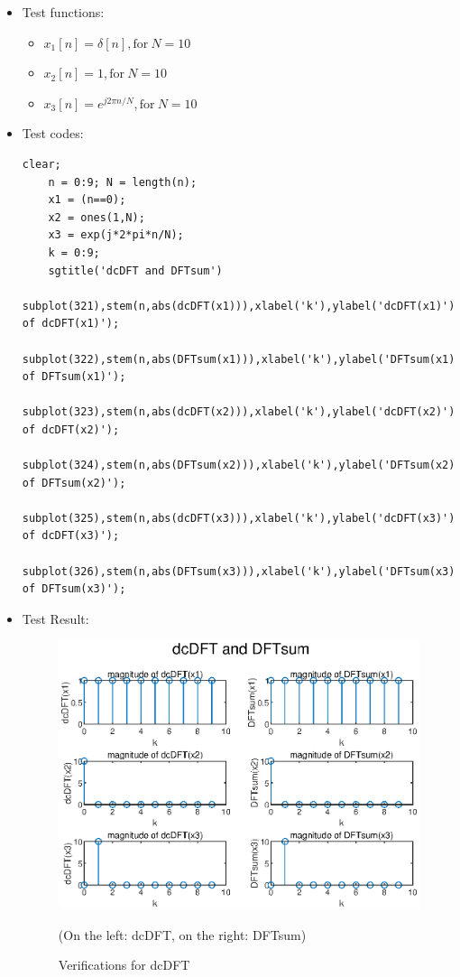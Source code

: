 \documentclass[onecolumn,oneside]{SUSTechHomework}
\begin{document}
\begin{itemize}
	\begin{itemize}
		\item Test functions:
		\begin{itemize}
			\item $x_1[n]=\delta[n], \text{for}\ N=10$
			\item $x_2[n]=1, \text{for}\ N=10$
			\item $x_3[n]=e^{j2\pi n/N}, \text{for}\ N=10$
		\end{itemize}
		\item Test codes:
\begin{lstlisting}[title=\textbf{q5\_3\_1}]
	clear;
	n = 0:9; N = length(n);
	x1 = (n==0);
	x2 = ones(1,N);
	x3 = exp(j*2*pi*n/N);
	k = 0:9;
	sgtitle('dcDFT and DFTsum')
	subplot(321),stem(n,abs(dcDFT(x1))),xlabel('k'),ylabel('dcDFT(x1)'),title('magnitude of dcDFT(x1)');
	subplot(322),stem(n,abs(DFTsum(x1))),xlabel('k'),ylabel('DFTsum(x1)'),title('magnitude of DFTsum(x1)');
	subplot(323),stem(n,abs(dcDFT(x2))),xlabel('k'),ylabel('dcDFT(x2)'),title('magnitude of dcDFT(x2)');
	subplot(324),stem(n,abs(DFTsum(x2))),xlabel('k'),ylabel('DFTsum(x2)'),title('magnitude of DFTsum(x2)');
	subplot(325),stem(n,abs(dcDFT(x3))),xlabel('k'),ylabel('dcDFT(x3)'),title('magnitude of dcDFT(x3)');
	subplot(326),stem(n,abs(DFTsum(x3))),xlabel('k'),ylabel('DFTsum(x3)'),title('magnitude of DFTsum(x3)');
\end{lstlisting}	
		\item  Test Result:
		\begin{figure}[H]
			\centering
			\includegraphics[width=170mm]{pictures/q5_3_1.eps}
			\caption{Verifications for dcDFT}
			(On the left: dcDFT, on the right: DFTsum)

\end{figure}
\end{itemize}
\end{itemize}
\end{document}
